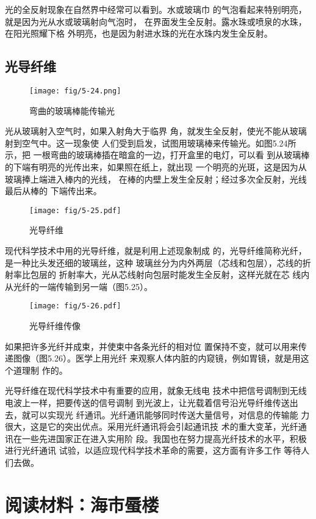 光的全反射现象在自然界中经常可以看到。水或玻璃巾
的气泡看起来特别明亮，就是因为光从水或玻璃射向气泡时，
在界面发生全反射。露水珠或喷泉的水珠，在阳光照耀下格
外明亮，也是因为射进水珠的光在水珠内发生全反射。

\subsection{光导纤维}
\begin{figure}[htp]\centering
    \texttt{[image: fig/5-24.png]}
    \caption{弯曲的玻璃棒能传输光}
    \end{figure}

光从玻璃射入空气时，如果入射角大于临界
角，就发生全反射，使光不能从玻璃射到空气中。这一现象使
人们受到启发，试图用玻璃棒来传输光。如图5.24所示，把
一根弯曲的玻璃棒插在暗盒的一边，打开盒里的电灯，可以看
到从玻璃棒的下端有明亮的光传出来，如果照在纸上，就出现
一个明亮的光斑，这是因为从玻璃捧上端进入棒内的光线，
在棒的内壁上发生全反射；经过多次全反射，光线最后从棒的
下端传出来。
\begin{figure}[htp]\centering
    \texttt{[image: fig/5-25.pdf]}
    \caption{光导纤维}
    \end{figure}

现代科学技术中用的光导纤维，就是利用上述现象制成
的，光导纤维简称光纤，是一种比头发还细的玻璃丝，这种
玻璃丝分为内外两层（芯线和包层），芯线的折射率比包层的
折射率大，光从芯线射向包层时能发生全反射，这样光就在芯
线内从光纤的一端传输到另一端（图5.25）。
\begin{figure}[htp]\centering
    \texttt{[image: fig/5-26.pdf]}
    \caption{光导纤维传像}
    \end{figure}

如果把许多光纤并成束，并使束中各条光纤的相对位
置保持不变，就可以用来传递图像（图5.26）。医学上用光纤
来观察人体内脏的内窥镜，例如胃镜，就是用这个道理制
作的。

光导纤维在现代科学技术中有重要的应用，就象无线电
技术中把信号调制到无线电波上一样，把要传送的信号调制
到光波上，让光载着信号沿光导纤维传送出去，就可以实现光
纤通讯。光纤通讯能够同时传送大量信号，对信息的传输能
力很大，这是它的突出优点。采用光纤通讯将会引起通讯技
术的重大变革，光纤通讯在一些先进国家正在进入实用阶
段。我国也在努力提高光纤技术的水平，积极进行光纤通讯
试验，以适应现代科学技术革命的需要，这方面有许多工作
等待人们去做。

\section*{阅读材料：海市蜃楼}

